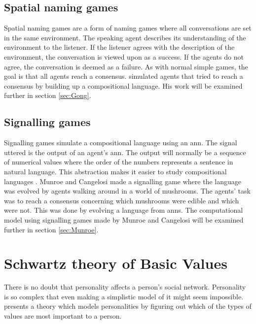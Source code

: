 \subsection{Spatial naming games}
Spatial naming games are a form of naming games where all conversations are set in the same environment. The speaking agent describes its understanding of the environment to the listener. If the listener agrees with the description of the environment, the conversation is viewed upon as a success. If the agents do not agree, the conversation is deemed as a failure. As with normal simple games, the goal is that all agents reach a consensus. \citet{gong2011simulating} simulated agents that tried to reach a consensus by building up a compositional language. His work will be examined further in section \ref{sec:Gong}.

\subsection{Signalling games}
Signalling games simulate a compositional language using an \ac{ann}. The signal uttered is the output of an agent's \ac{ann}. The output will normally be a sequence of numerical values where the order of the numbers represents a sentence in natural language. This abstraction makes it easier to study compositional languages \citep{munroe2002learning, suzuki2008learning}. Munroe and Cangelosi made a signalling game where the language was evolved by agents walking around in a world of mushrooms. The agents' task was to reach a consensus concerning which mushrooms were edible and which were not. This was done by evolving a language from \acp{ann}. The computational model using signalling games made by Munroe and Cangelosi will be examined further in section \ref{sec:Munroe}.

\section{Schwartz theory of Basic Values}\label{SchwartzBasicValues}
There is no doubt that personality affects a person's social network. Personality is so complex that even making a simplistic model of it might seem impossible. \citet{schwartz1992unniversals} presents a theory which models personalities by figuring out which of the types of values are most important to a person.

